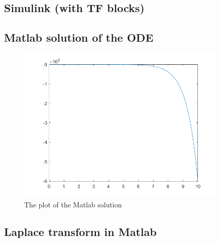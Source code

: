 \documentclass{article}
\begin{document}
    \subsection{Simulink (with TF blocks)}
    
    \subsection{Matlab solution of the ODE}
    
    
    \begin{figure}[h]
        \centering
        \includegraphics[width=0.9\textwidth]{images/solution2c_j.png}
        \caption{The plot of the Matlab solution}
        \label{fig:plot1c}
    \end{figure}
    
    \subsection{Laplace transform in Matlab}
    
    
 
\end{document}

